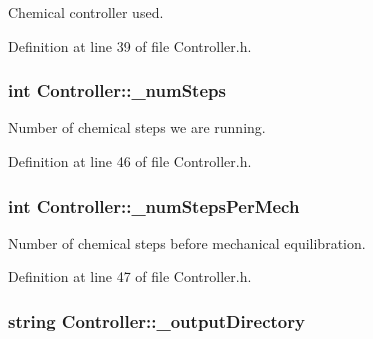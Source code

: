 Chemical controller used. 



Definition at line 39 of file Controller.\+h.

\hypertarget{classController_adae40ed2ed9f44879930207bcff76ed0}{
\subsubsection[{\+\_\+num\+Steps}]{\setlength{\rightskip}{0pt plus 5cm}int Controller\+::\+\_\+num\+Steps\hspace{0.3cm}{\ttfamily [private]}}}\label{classController_adae40ed2ed9f44879930207bcff76ed0}


Number of chemical steps we are running. 



Definition at line 46 of file Controller.\+h.

\hypertarget{classController_aa68939f419d5c6062f303ee85f24ad08}{
\subsubsection[{\+\_\+num\+Steps\+Per\+Mech}]{\setlength{\rightskip}{0pt plus 5cm}int Controller\+::\+\_\+num\+Steps\+Per\+Mech\hspace{0.3cm}{\ttfamily [private]}}}\label{classController_aa68939f419d5c6062f303ee85f24ad08}


Number of chemical steps before mechanical equilibration. 



Definition at line 47 of file Controller.\+h.

\hypertarget{classController_a4220a82387be41130d63223504a2cffe}{
\subsubsection[{\+\_\+output\+Directory}]{\setlength{\rightskip}{0pt plus 5cm}string Controller\+::\+\_\+output\+Directory\hspace{0.3cm}{\ttfamily [private]}}}\label{classController_a4220a82387be41130d63223504a2cffe}


